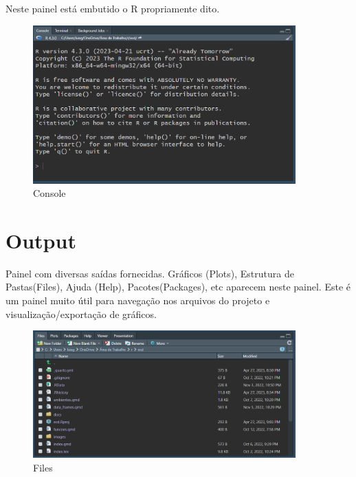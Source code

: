 \documentclass[
  letterpaper,
  DIV=11,
  numbers=noendperiod]{scrreprt}
\begin{document}
Neste painel está embutido o R propriamente dito.

\begin{figure}

{\centering \includegraphics[width=0.9\textwidth,height=\textheight]{./images/rstudio/console.PNG}

}

\caption{\label{fig-rstudio-console}Console}

\end{figure}

\hypertarget{output}{%
\section{Output}\label{output}}

Painel com diversas saídas fornecidas. Gráficos (Plots), Estrutura de
Pastas(Files), Ajuda (Help), Pacotes(Packages), etc aparecem neste
painel. Este é um painel muito útil para navegação nos arquivos do
projeto e visualização/exportação de gráficos.

\begin{figure}

{\centering \includegraphics[width=0.9\textwidth,height=\textheight]{./images/rstudio/files.PNG}

}

\caption{\label{fig-rstudio-files}Files}

\end{figure}
\end{document}
